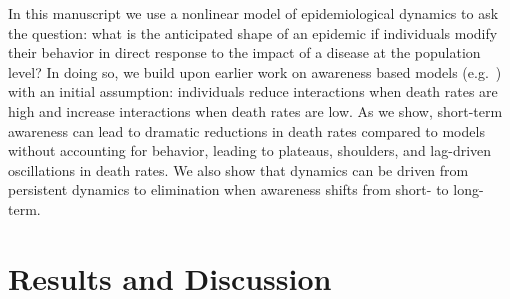 In this manuscript we use a nonlinear model of epidemiological dynamics to
ask the question: what is the anticipated
shape of an epidemic if individuals modify their behavior in direct
response to the impact of a disease at the population level? In doing so,
we build upon earlier work on awareness based models (e.g.~\citep{funk2009spread,funk2010modelling,eksin2017disease, eksin2019systematic}) with an
initial assumption: individuals reduce interactions when 
death rates are high and increase interactions when death rates are low.  
As we show, short-term awareness can lead to dramatic reductions
in death rates compared to models without accounting for behavior,
leading to plateaus, shoulders,
and lag-driven oscillations in death rates. We also show that dynamics
can be driven from persistent dynamics to elimination when
awareness shifts from short- to long-term.


\section{Results and Discussion}
